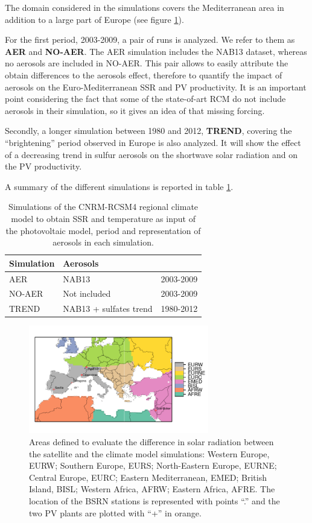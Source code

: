 The domain considered in the simulations covers the Mediterranean area in addition to a large part of Europe (see figure \ref{fig:mapapral}).

For the first period, 2003-2009, a pair of runs is analyzed. We refer to them as \textbf{AER} and \textbf{NO-AER}. The AER simulation includes the NAB13 dataset, whereas no aerosols are included in NO-AER. This pair allows to easily attribute the obtain differences to the aerosols effect, therefore to quantify the impact of aerosols on the Euro-Mediterranean SSR and PV productivity. It is an important point considering the fact that some of the state-of-art RCM do not include aerosols in their simulation, so it gives an idea of that missing forcing.

Secondly, a longer simulation between 1980 and 2012, \textbf{TREND}, covering the ``brightening'' period observed in Europe is also analyzed. It will show the effect of a decreasing trend in sulfur aerosols on the shortwave solar radiation and on the PV productivity.  

A summary of the different simulations is reported in table \ref{tabSIM}.

\begin{table}
  \begin{tabular}{>{\raggedright}m{2cm}>{\raggedright}m{3cm}>{\raggedright}m{2cm}}
    \toprule 
    Simulation & Aerosols & \centering{Period}\tabularnewline
    \midrule
    AER & NAB13 & 2003-2009
    \tabularnewline
    \midrule
    NO-AER & Not included & 2003-2009
   \tabularnewline
   \midrule           
  TREND & NAB13 + sulfates trend & 1980-2012
   \tabularnewline
    \bottomrule
  \end{tabular}
  \caption{Simulations of the CNRM-RCSM4 regional climate model to obtain SSR and temperature as input of the photovoltaic model, period and representation of aerosols in each simulation.}
\label{tabSIM}
\end{table}

\begin{figure}[h!]
\centering\includegraphics[width=0.7\textwidth]{figs/capitulo6/zonasPuntosLabel.pdf}
\caption{Areas defined to evaluate the difference in solar radiation between the satellite and the climate model simulations: Western Europe, EURW; Southern Europe, EURS; North-Eastern Europe, EURNE; Central Europe, EURC; Eastern Mediterranean, EMED; British Island, BISL; Western Africa, AFRW; Eastern Africa, AFRE. The location of the BSRN stations is represented with points ``.'' and the two PV plants are plotted with ``+'' in orange.}
\label{fig:mapapral}
\end{figure}

